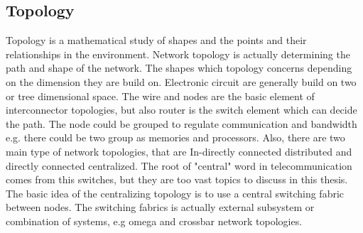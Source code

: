             \subsection{Topology}
            Topology is a mathematical study of shapes and the points and their relationships in the environment. Network topology is actually determining the path and shape of the network. The shapes which topology concerns depending on the dimension they are build on. Electronic circuit are generally build on two or tree dimensional space. The wire and nodes are the basic element of interconnector topologies, but also router is the switch element which can decide the path. The node could be grouped to regulate communication and bandwidth e.g. there could be two group as memories and processors. Also, there are two main type of network topologies, that are In-directly connected distributed and directly connected centralized. The root of "central" word in telecommunication comes from this switches, but they are too vast topics to discuss in this thesis. The basic idea of the centralizing topology is to use a central switching fabric between nodes. The switching fabrics is actually external subsystem or combination of systems, e.g omega and crossbar network topologies\cite{0122007514}.


